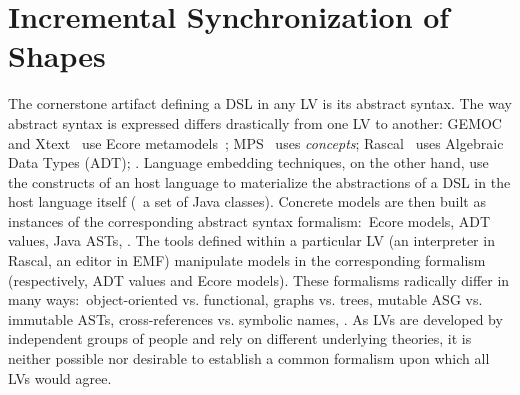 \section{Incremental Synchronization of Shapes}
\label{sec:prism}

The cornerstone artifact defining a DSL in any LV is its abstract syntax.
The way abstract syntax is expressed differs drastically from one LV to another: GEMOC~\cite{bousse2016execution} and Xtext~\cite{bettini2016implementing} use Ecore metamodels~\cite{steinberg2008emf}; MPS~\cite{voelter2014generic} uses \emph{concepts}; Rascal~\cite{klint2010easy} uses Algebraic Data Types (ADT); \etc.
Language embedding techniques, on the other hand, use the constructs of an host language to materialize the abstractions of a DSL in the host language itself (\eg~a set of Java classes).
Concrete models are then built as instances of the corresponding abstract syntax formalism:~Ecore models, ADT values, Java ASTs, \etc.
The tools defined within a particular LV (an interpreter in Rascal, an editor in EMF) manipulate models in the corresponding formalism (respectively, ADT values and Ecore models).
These formalisms radically differ in many ways:~object-oriented vs. functional, graphs vs. trees, mutable ASG vs. immutable ASTs, cross-references vs. symbolic names, \etc.
As LVs are developed by independent groups of people and rely on different underlying theories, it is neither possible nor desirable to establish a common formalism upon which all LVs would agree.

%
%

